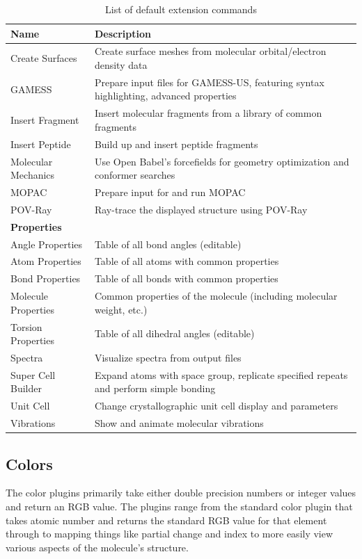 \documentclass[10pt]{bmc_article}
\newenvironment{bmcformat}{\begin{raggedright}
\baselineskip20pt\sloppy\setboolean{publ}{false}}{\end{raggedright}
\baselineskip20pt\sloppy}
\begin{document}
\begin{bmcformat}
\begin{table}
  \caption{List of default extension commands}
  \label{extension-table}
\begin{tabular}{l | l}
\hline
Name & Description \\
\hline
Create Surfaces & Create surface meshes from molecular orbital/electron density data \\
GAMESS & Prepare input files for GAMESS-US, featuring syntax highlighting, advanced properties \\
Insert Fragment & Insert molecular fragments from a library of common fragments \\
Insert Peptide & Build up and insert peptide fragments \\
Molecular Mechanics & Use Open Babel's forcefields for geometry optimization and conformer searches \\
MOPAC & Prepare input for and run MOPAC  \\
POV-Ray & Ray-trace the displayed structure using POV-Ray \\
\textbf{Properties} \\
Angle Properties & Table of all bond angles (editable)\\
Atom Properties & Table of all atoms with common properties \\
Bond Properties & Table of all bonds with common properties \\
Molecule Properties & Common properties of the molecule (including
molecular weight, etc.)\\
Torsion Properties & Table of all dihedral angles (editable) \\
Spectra & Visualize spectra from output files \\
Super Cell Builder & Expand atoms with space group, replicate specified repeats and perform simple bonding \\
Unit Cell & Change crystallographic unit cell display and parameters \\
Vibrations & Show and animate molecular vibrations \\
\hline
\end{tabular}
\end{table}

\subsection{Colors}

The color plugins primarily take either double precision numbers or integer
values and return an RGB value. The plugins range from the standard color
plugin that takes atomic number and returns the standard RGB value for that
element through to mapping things like partial change and index to more easily
view various aspects of the molecule's structure.


\end{bmcformat}
\end{document}
